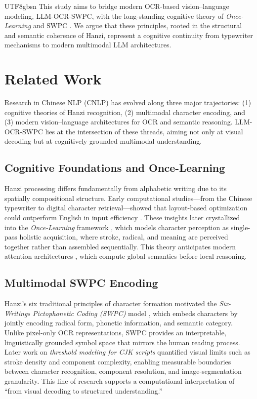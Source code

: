 \documentclass[conference]{IEEEtran}
\begin{document}
\begin{CJK*}{UTF8}{gbsn}
This study aims to bridge modern OCR-based vision–language modeling, LLM-OCR-SWPC, with the long-standing cognitive theory of \textit{Once-Learning} \cite{weigang1999study,weigang2022hol,althoff2022once} and SWPC \cite{weigang2024six}. We argue that these principles, rooted in the structural and semantic coherence of Hanzi, represent a cognitive continuity from typewriter mechanisms to modern multimodal LLM architectures. 

\section{Related Work}
\label{sec:relatedwork}

Research in Chinese NLP (CNLP) has evolved along three major trajectories: (1) cognitive theories of Hanzi recognition, (2) multimodal character encoding, and (3) modern vision--language architectures for OCR and semantic reasoning. LLM-OCR-SWPC lies at the intersection of these threads, aiming not only at visual decoding but at cognitively grounded multimodal understanding.

\subsection{Cognitive Foundations and Once-Learning}
Hanzi processing differs fundamentally from alphabetic writing due to its spatially compositional structure. Early computational studies---from the Chinese typewriter to digital character retrieval---showed that layout-based optimization could outperform English in input efficiency \cite{mullaney2017chinese,weigang2022typewriter}. These insights later crystallized into the \textit{Once-Learning} framework \cite{weigang1999study,weigang2022hol,althoff2022once}, which models character perception as single-pass holistic acquisition, where stroke, radical, and meaning are perceived together rather than assembled sequentially. This theory anticipates modern attention architectures \cite{vaswani2017attention}, which compute global semantics before local reasoning.

\subsection{Multimodal SWPC Encoding}
Hanzi’s six traditional principles of character formation motivated the \textit{Six-Writings Pictophonetic Coding (SWPC)} model \cite{weigang2024six}, which embeds characters by jointly encoding radical form, phonetic information, and semantic category. Unlike pixel-only OCR representations, SWPC provides an interpretable, linguistically grounded symbol space that mirrors the human reading process. Later work on \textit{threshold modeling for CJK scripts} \cite{weigang2025threshold} quantified visual limits such as stroke density and component complexity, enabling measurable boundaries between character recognition, component resolution, and image-segmentation granularity. This line of research supports a computational interpretation of “from visual decoding to structured understanding.”


\end{CJK*}
\end{document}

